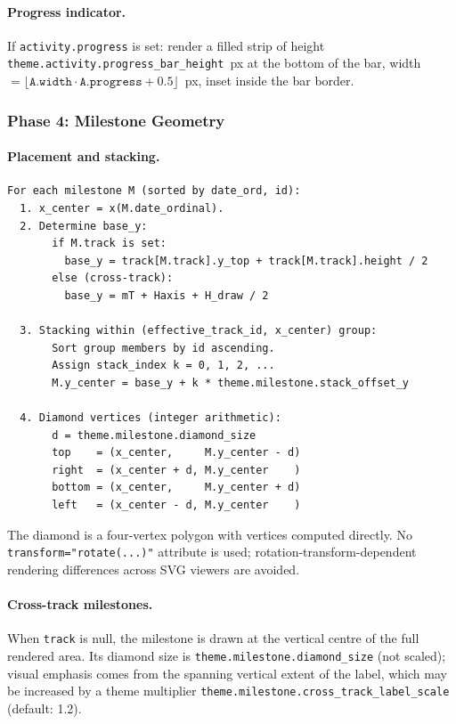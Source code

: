 \paragraph{Progress indicator.}
If \texttt{activity.progress} is set: render a filled strip of height
\texttt{theme.activity.progress\_bar\_height}~px at the bottom of the bar, width $=
\lfloor \texttt{A.width} \cdot \texttt{A.progress} + 0.5 \rfloor$~px, inset inside the
bar border.

\subsubsection{Phase 4: Milestone Geometry}
\label{sec:phase4}

\paragraph{Placement and stacking.}

\begin{lstlisting}[caption={Phase 4: Milestone placement and stacking}]
For each milestone M (sorted by date_ord, id):
  1. x_center = x(M.date_ordinal).
  2. Determine base_y:
       if M.track is set:
         base_y = track[M.track].y_top + track[M.track].height / 2
       else (cross-track):
         base_y = mT + Haxis + H_draw / 2

  3. Stacking within (effective_track_id, x_center) group:
       Sort group members by id ascending.
       Assign stack_index k = 0, 1, 2, ...
       M.y_center = base_y + k * theme.milestone.stack_offset_y

  4. Diamond vertices (integer arithmetic):
       d = theme.milestone.diamond_size
       top    = (x_center,     M.y_center - d)
       right  = (x_center + d, M.y_center    )
       bottom = (x_center,     M.y_center + d)
       left   = (x_center - d, M.y_center    )
\end{lstlisting}

The diamond is a four-vertex polygon with vertices computed directly. No
\texttt{transform="rotate(...)"} attribute is used; rotation-transform-dependent rendering
differences across SVG viewers are avoided.

\paragraph{Cross-track milestones.}
When \texttt{track} is null, the milestone is drawn at the vertical centre of the full
rendered area. Its diamond size is \texttt{theme.milestone.diamond\_size} (not scaled);
visual emphasis comes from the spanning vertical extent of the label, which may be increased
by a theme multiplier \texttt{theme.milestone.cross\_track\_label\_scale} (default: 1.2).

